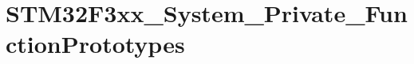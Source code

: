\hypertarget{group___s_t_m32_f3xx___system___private___function_prototypes}{}\section{S\+T\+M32\+F3xx\+\_\+\+System\+\_\+\+Private\+\_\+\+Function\+Prototypes}
\label{group___s_t_m32_f3xx___system___private___function_prototypes}
